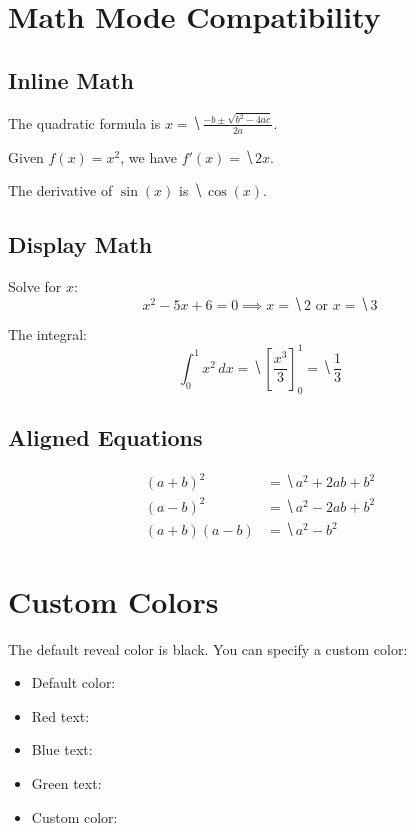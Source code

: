 \documentclass[11pt,a4paper]{article}
\begin{document}
\section{Math Mode Compatibility}

\subsection{Inline Math}

The quadratic formula is $x = \hide{\frac{-b \pm \sqrt{b^2 - 4ac}}{2a}}$.

Given $f(x) = x^2$, we have $f'(x) = \hide{2x}$.

The derivative of $\sin(x)$ is $\hide{\cos(x)}$.

\subsection{Display Math}

Solve for $x$:
\[
  x^2 - 5x + 6 = 0 \implies x = \hide{2} \text{ or } x = \hide{3}
\]

The integral:
\[
  \int_0^1 x^2 \, dx = \hide{\left[\frac{x^3}{3}\right]_0^1} = \hide{\frac{1}{3}}
\]

\subsection{Aligned Equations}

\begin{align*}
  (a + b)^2 &= \hide{a^2 + 2ab + b^2} \\
  (a - b)^2 &= \hide{a^2 - 2ab + b^2} \\
  (a + b)(a - b) &= \hide{a^2 - b^2}
\end{align*}

\section{Custom Colors}

The default reveal color is black. You can specify a custom color:

\begin{itemize}
  \item Default color: 
  \item Red text: 
  \item Blue text: 
  \item Green text: 
  \item Custom color: 
\end{itemize}
\end{document}
